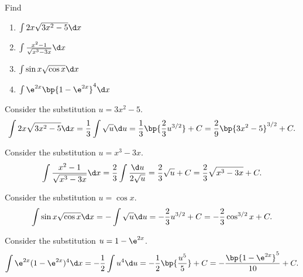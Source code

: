 \begin{problem}
    Find
    \begin{enumerate}
        \item $\int 2x\sqrt{3x^2 - 5} \d x$
        \item $\int \frac{x^2 - 1}{\sqrt{x^3 - 3x}} \d x$
        \item $\int \sin x \sqrt{\cos x} \d x$
        \item $\int \e^{2x} \bp{1 - \e^{2x}}^4 \d x$
    \end{enumerate}
\end{problem}
\begin{solution}
    \begin{ppart}
        Consider the substitution $u = 3x^2 - 5$. \[\int 2x\sqrt{3x^2 - 5} \d x = \frac13 \int \sqrt{u} \d u = \frac13 \bp{\frac23 u^{3/2}} + C = \frac29 \bp{3x^2 - 5}^{3/2} + C.\]
    \end{ppart}
    \begin{ppart}
        Consider the substitution $u = x^3 - 3x$.
        \begin{align*}
            \int \frac{x^2 - 1}{\sqrt{x^3 - 3x}} \d x = \frac23 \int \frac{\d u}{2\sqrt{u}} = \frac23 \sqrt{u} + C = \frac23 \sqrt{x^3 - 3x} + C.
        \end{align*}
    \end{ppart}
    \begin{ppart}
        Consider the substitution $u = \cos x$. \[\int \sin x \sqrt{\cos x} \d x = - \int \sqrt{u} \d u = -\frac23 u^{3/2} + C = -\frac23 \cos^{3/2} x + C.\]
    \end{ppart}
    \begin{ppart}
        Consider the substitution $u = 1 - \e^{2x}$. \[\int \e^{2x}(1 - \e^{2x})^4 \d x = -\frac12 \int u^4 \d u = -\frac12 \bp{\frac{u^5}{5}} + C = -\frac{\bp{1 - \e^{2x}}^5}{10} + C.\]
    \end{ppart}
\end{solution}

